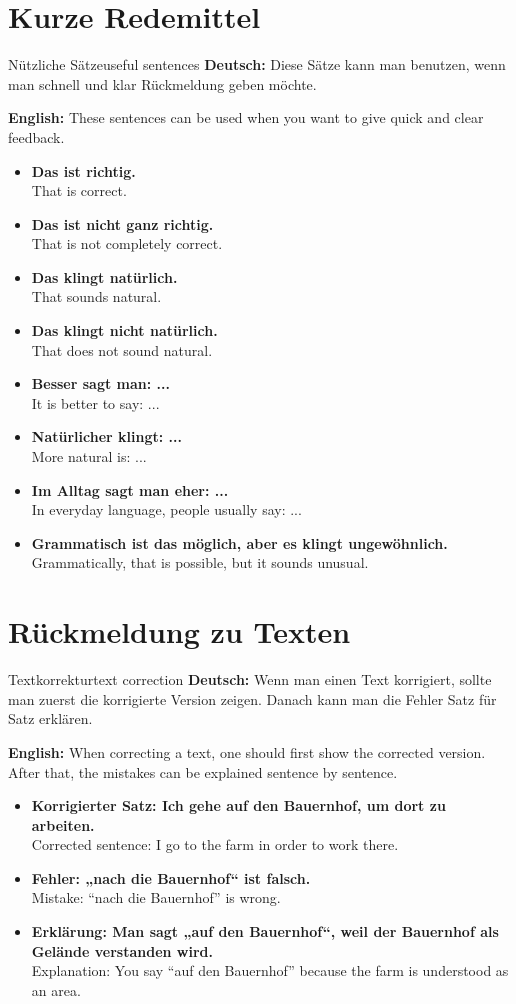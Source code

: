 \documentclass[a4paper,11pt]{article}
\newcommand{\GermanText}[1]{\textbf{Deutsch: }#1\par}
\newcommand{\EnglishText}[1]{{\small\color{SoftGray}\textbf{English: }#1\par}}
\newcommand{\ExampleItem}[2]{\item \textbf{#1}\\{\small\color{SoftGray}#2}}
\begin{document}
    
    \section{Kurze Redemittel}
        
        \begin{grammarentry}{Nützliche Sätze}{useful sentences}
            \GermanText{Diese Sätze kann man benutzen, wenn man schnell und klar Rückmeldung geben möchte.}
            \EnglishText{These sentences can be used when you want to give quick and clear feedback.}
            
            \begin{exbox}
                \begin{itemize}
                    \ExampleItem{Das ist richtig.}{That is correct.}
                    \ExampleItem{Das ist nicht ganz richtig.}{That is not completely correct.}
                    \ExampleItem{Das klingt natürlich.}{That sounds natural.}
                    \ExampleItem{Das klingt nicht natürlich.}{That does not sound natural.}
                    \ExampleItem{Besser sagt man: ...}{It is better to say: ...}
                    \ExampleItem{Natürlicher klingt: ...}{More natural is: ...}
                    \ExampleItem{Im Alltag sagt man eher: ...}{In everyday language, people usually say: ...}
                    \ExampleItem{Grammatisch ist das möglich, aber es klingt ungewöhnlich.}{Grammatically, that is possible, but it sounds unusual.}
                \end{itemize}
            \end{exbox}
        \end{grammarentry}
    
    
    \section{Rückmeldung zu Texten}
        
        \begin{grammarentry}{Textkorrektur}{text correction}
            \GermanText{Wenn man einen Text korrigiert, sollte man zuerst die korrigierte Version zeigen. Danach kann man die Fehler Satz für Satz erklären.}
            \EnglishText{When correcting a text, one should first show the corrected version. After that, the mistakes can be explained sentence by sentence.}
            
            \begin{exbox}
                \begin{itemize}
                    \ExampleItem{Korrigierter Satz: Ich gehe auf den Bauernhof, um dort zu arbeiten.}{Corrected sentence: I go to the farm in order to work there.}
                    \ExampleItem{Fehler: „nach die Bauernhof“ ist falsch.}{Mistake: “nach die Bauernhof” is wrong.}
                    \ExampleItem{Erklärung: Man sagt „auf den Bauernhof“, weil der Bauernhof als Gelände verstanden wird.}{Explanation: You say “auf den Bauernhof” because the farm is understood as an area.}
                \end{itemize}
            \end{exbox}
        \end{grammarentry}
    
\end{document}
